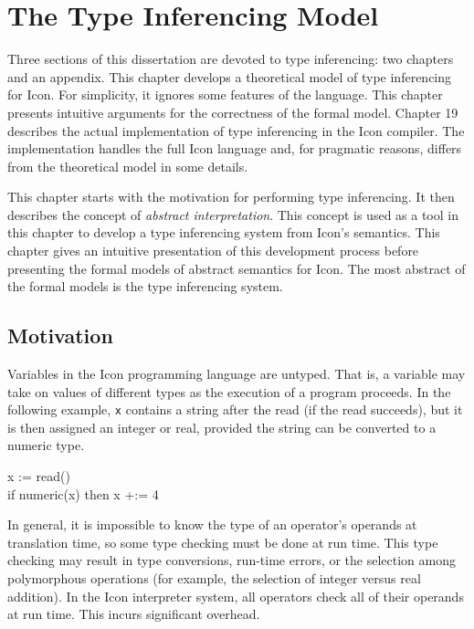 \clearpage\chapter{The Type Inferencing Model}

Three sections of this dissertation are devoted to type inferencing:
two chapters and an appendix. This chapter develops a theoretical
model of type inferencing for Icon. For simplicity, it ignores some
features of the language. This chapter presents intuitive arguments
for the correctness of the formal model. Chapter 19 describes the
actual implementation of type inferencing in the Icon compiler. The
implementation handles the full Icon language and, for pragmatic
reasons, differs from the theoretical model in some details.


This chapter starts with the motivation for performing type
inferencing. It then describes the concept of \textit{abstract
interpretation}. This concept is used as a tool in this chapter to
develop a type inferencing system from Icon's semantics. This chapter
gives an intuitive presentation of this development process before
presenting the formal models of abstract semantics for Icon. The most
abstract of the formal models is the type inferencing system.

\section{Motivation}

Variables in the Icon programming language are untyped. That is, a
variable may take on values of different types as the execution of a
program proceeds. In the following example, \texttt{x} contains a
string after the read (if the read succeeds), but it is then assigned
an integer or real, provided the string can be converted to a numeric
type.

\goodbreak
\begin{iconcode}
x := read()\\
if numeric(x) then x +:= 4\\
\end{iconcode}


In general, it is impossible to know the type of an operator's
operands at translation time, so some type checking must be done at
run time. This type checking may result in type conversions, run-time
errors, or the selection among polymorphous operations (for example,
the selection of integer versus real addition). In the Icon
interpreter system, all operators check all of their operands at run
time. This incurs significant overhead.

